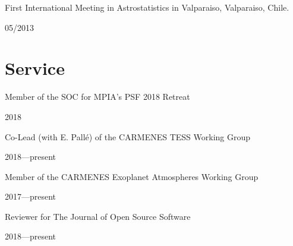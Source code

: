 \documentclass[12pt, a4paper]{article} %
\begin{document}
\begin{minipage}[t]{0.7\textwidth}
\begin{flushleft}%
  \setlength{\leftskip}{0.2cm}%
First International Meeting in Astrostatistics in Valparaiso, Valparaiso, Chile. 
\end{flushleft}
\end{minipage}
\begin{minipage}[t]{0.3\textwidth}
\hfill 05/2013
\end{minipage}

\section*{Service}

\begin{minipage}[t]{0.7\textwidth}
\begin{flushleft}%
  \setlength{\leftskip}{0.2cm}%
Member of the SOC for MPIA's PSF 2018 Retreat 
\end{flushleft}
\end{minipage}
\begin{minipage}[t]{0.3\textwidth}
\hfill 2018
\end{minipage}

\begin{minipage}[t]{0.7\textwidth}
\begin{flushleft}%
  \setlength{\leftskip}{0.2cm}%
Co-Lead (with E. Pall\'e) of the CARMENES TESS Working Group 
\end{flushleft}
\end{minipage}
\begin{minipage}[t]{0.3\textwidth}
\hfill 2018---present
\end{minipage}

\begin{minipage}[t]{0.7\textwidth}
\begin{flushleft}%
  \setlength{\leftskip}{0.2cm}%
Member of the CARMENES Exoplanet Atmospheres Working Group 
\end{flushleft}
\end{minipage}
\begin{minipage}[t]{0.3\textwidth}
\hfill 2017---present
\end{minipage}

\begin{minipage}[t]{0.7\textwidth}
\begin{flushleft}%
  \setlength{\leftskip}{0.2cm}%
Reviewer for The Journal of Open Source Software
\end{flushleft}
\end{minipage}
\begin{minipage}[t]{0.3\textwidth}
\hfill 2018---present
\end{minipage}
\end{document}
